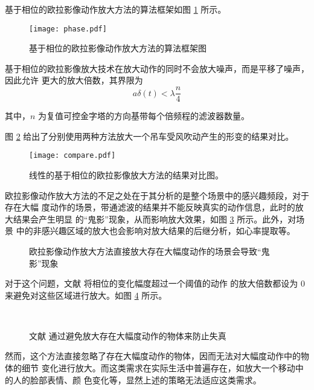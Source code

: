 基于相位的欧拉影像动作放大方法的算法框架如图 \ref{fig:phase} 所示。

\begin{figure}[htbp]
  \centering
  \texttt{[image: phase.pdf]}
  \caption{基于相位的欧拉影像动作放大方法的算法框架图}
  \label{fig:phase}
\end{figure}

基于相位的欧拉影像放大技术在放大动作的同时不会放大噪声，而是平移了噪声，因此允许
更大的放大倍数，其界限为
\begin{equation}
  \label{eq:bound2}
  a\delta(t)<\lambda \frac{n}{4}
\end{equation}

其中，$n$ 为复值可控金字塔的方向基带每个倍频程的滤波器数量。

图 \ref{fig:compare} 给出了分别使用两种方法放大一个吊车受风吹动产生的形变的结果对比。

\begin{figure}[htbp]
  \centering
  \texttt{[image: compare.pdf]}
  \caption{线性的基于相位的欧拉影像放大方法的结果对比图。
  }
  \label{fig:compare}
\end{figure}

欧拉影像动作放大方法的不足之处在于其分析的是整个场景中的感兴趣频段，对于存在大幅
度动作的场景，带通滤波的结果并不能反映真实的动作信息，此时的放大结果会产生明显
的“鬼影”现象，从而影响放大效果，如图 \ref{fig:large-motion} 所示。此外，对场景
中的非感兴趣区域的放大也会影响对放大结果的后继分析，如心率提取等。

\clearpage

\begin{figure}[htbp]
  \centering
  \qquad
  \caption{欧拉影像动作放大方法直接放大存在大幅度动作的场景会导致“鬼影”现象}
  \label{fig:large-motion}
\end{figure}

对于这个问题，文献 \cite{Wadhwa2013PhaseBased} 将相位的变化幅度超过一个阈值的动作
的放大倍数都设为 0 来避免对这些区域进行放大。如图 \ref{fig:ignore} 所示。

\begin{figure}[htbp]
  \centering
  ~
  \caption{文献 \cite{Wadhwa2013PhaseBased} 通过避免放大存在大幅度动作的物体来防止失真}
  \label{fig:ignore}
\end{figure}

然而，这个方法直接忽略了存在大幅度动作的物体，因而无法对大幅度动作中的物体的细节
变化进行放大。而这类需求在实际生活中普遍存在，如放大一个移动中的人的脸部表情、颜
色变化等，显然上述的策略无法适应这类需求。

